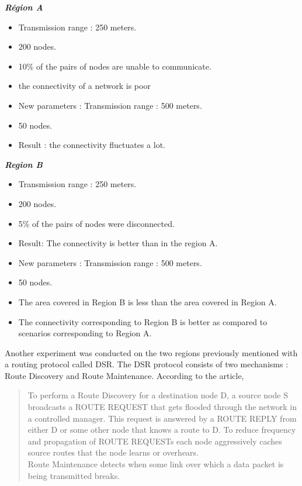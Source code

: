 \begin{multicols}{2}
\textit{\textbf{Région A}}
\begin{itemize}
\item Transmission range : 250 meters.
\item 200 nodes.
\item 10\% of the pairs of nodes are unable to communicate.
\item the connectivity of a network is poor
\item New parameters : Transmission range : 500 meters.
\item 50 nodes.
\item Result : the connectivity fluctuates a lot.
\end{itemize}
\columnbreak
\textit{\textbf{Region B}}
\begin{itemize}
\item Transmission range : 250 meters.
\item 200 nodes.
\item 5\% of the pairs of nodes were disconnected.
\item Result: The connectivity is better than in the region A.
\item New parameters : Transmission range : 500 meters.
\item 50 nodes.
\item The area covered in Region B is less than the area covered in Region A.
\item The connectivity corresponding to Region B is better as compared to scenarios corresponding to Region A.
\end{itemize}
\end{multicols}

Another experiment was conducted on the two regions previously mentioned with a routing protocol called DSR. The DSR protocol consists of two mechanisms : Route Discovery and Route Maintenance. According to the article, 
\begin{quotation}
To perform a Route Discovery for a destination node D, a source node S broadcasts a ROUTE REQUEST that gets flooded through the network in a controlled manager. This request is answered by a ROUTE REPLY from either D or some other node that knows a route to D. To reduce frequency and propagation of ROUTE REQUESTs each node aggressively caches source routes that the node learns or overhears.\\
Route Maintenance detects when some link over which a data packet is being transmitted breaks\cite{VehicularAdHocNetworks9}.
\end{quotation}

